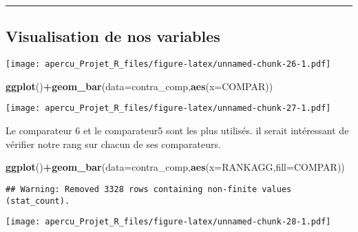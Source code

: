 \documentclass[
]{article}
\newenvironment{Shaded}{\begin{snugshade}}{\end{snugshade}}
\newcommand{\DataTypeTok}[1]{\textcolor[rgb]{0.13,0.29,0.53}{#1}}
\newcommand{\KeywordTok}[1]{\textcolor[rgb]{0.13,0.29,0.53}{\textbf{#1}}}
\newcommand{\NormalTok}[1]{#1}
\newcommand{\OperatorTok}[1]{\textcolor[rgb]{0.81,0.36,0.00}{\textbf{#1}}}
\begin{document}
\begin{center}\rule{0.5\linewidth}{0.5pt}\end{center}

\hypertarget{visualisation-de-nos-variables}{%
\subsection{Visualisation de nos
variables}\label{visualisation-de-nos-variables}}

\begin{Shaded}
\end{Shaded}

\texttt{[image: apercu\_Projet\_R\_files/figure-latex/unnamed-chunk-26-1.pdf]}

\begin{Shaded}
\begin{Highlighting}[]
\KeywordTok{ggplot}\NormalTok{()}\OperatorTok{+}\KeywordTok{geom_bar}\NormalTok{(}\DataTypeTok{data=}\NormalTok{contra_comp,}\KeywordTok{aes}\NormalTok{(}\DataTypeTok{x=}\NormalTok{COMPAR))}
\end{Highlighting}
\end{Shaded}

\texttt{[image: apercu\_Projet\_R\_files/figure-latex/unnamed-chunk-27-1.pdf]}

Le comparateur 6 et le comparateur5 sont les plus utilisés. il serait
intéressant de vérifier notre rang sur chacun de ses comparateurs.

\begin{Shaded}
\begin{Highlighting}[]
\KeywordTok{ggplot}\NormalTok{()}\OperatorTok{+}\KeywordTok{geom_bar}\NormalTok{(}\DataTypeTok{data=}\NormalTok{contra_comp,}\KeywordTok{aes}\NormalTok{(}\DataTypeTok{x=}\NormalTok{RANKAGG,}\DataTypeTok{fill=}\NormalTok{COMPAR))}
\end{Highlighting}
\end{Shaded}

\begin{verbatim}
## Warning: Removed 3328 rows containing non-finite values (stat_count).
\end{verbatim}

\texttt{[image: apercu\_Projet\_R\_files/figure-latex/unnamed-chunk-28-1.pdf]}
\end{document}
